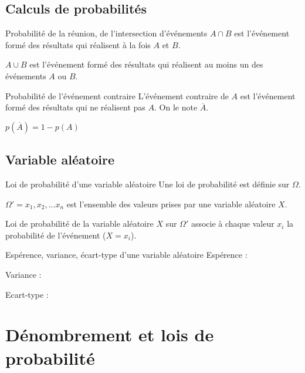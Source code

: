 \subsection{Calculs de probabilités}
\begin{bclogo}{Probabilité de la réunion, de l'intersection d'événements}
$A\cap B$ est l'événement formé des résultats qui réalisent à la fois $A$ et $B$.

$A\cup B$ est l'événement formé des résultats qui réalisent au moins un des événements $A$ ou $B$.

\end{bclogo}

\medskip

\begin{bclogo}{Probabilité de l'événement contraire}
L'événement contraire de $A$ est l'événement formé des résultats qui ne réalisent pas $A$. On le note $\overline{A}$. 

$p(\overline{A})=1-p(A)$
\end{bclogo}

\subsection{Variable aléatoire}
\begin{bclogo}{Loi de probabilité d'une variable aléatoire}
Une loi de probabilité est définie sur $\Omega$. 

$\Omega '= {x_1 ,x_2,...x_n}$ est l'ensemble des valeurs prises par une variable aléatoire $X$.

Loi de probabilité de la variable aléatoire $X$ sur $\Omega '$ associe à chaque valeur $x_i$ la probabilité de l'événement ($X=x_i$).
\end{bclogo}

\medskip

\begin{bclogo}{Espérence, variance, écart-type d'une variable aléatoire}
Espérence : 

Variance : 

Ecart-type : 
\end{bclogo}

\section{Dénombrement et lois de probabilité}
